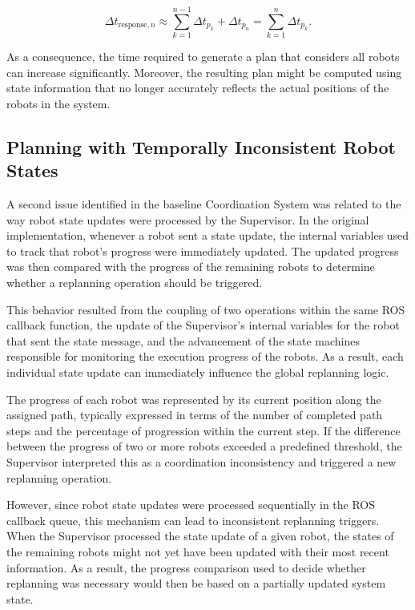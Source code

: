\begin{equation}
    \Delta t_{\text{response},n}
    \approx
    \sum_{k=1}^{n-1} \Delta t_{p_k} + \Delta t_{p_n}
    =
    \sum_{k=1}^{n} \Delta t_{p_k}.
    \label{eq:baseline_response_time}
\end{equation}

As a consequence, the time required to generate a plan that considers all robots can increase significantly. Moreover, the resulting plan might be computed using state information that no longer accurately reflects the actual positions of the robots in the system.

\subsection{Planning with Temporally Inconsistent Robot States}
\label{subsec:temporally_inconsistent_states}
\hspace{\parindent}
A second issue identified in the baseline Coordination System was related to the way robot state updates were processed by the Supervisor. In the original implementation, whenever a robot sent a state update, the internal variables used to track that robot's progress were immediately updated. The updated progress was then compared with the progress of the remaining robots to determine whether a replanning operation should be triggered.

This behavior resulted from the coupling of two operations within the same ROS callback function, the update of the Supervisor's internal variables for the robot that sent the state message, and the advancement of the state machines responsible for monitoring the execution progress of the robots. As a result, each individual state update can immediately influence the global replanning logic.

The progress of each robot was represented by its current position along the assigned path, typically expressed in terms of the number of completed path steps and the percentage of progression within the current step. If the difference between the progress of two or more robots exceeded a predefined threshold, the Supervisor interpreted this as a coordination inconsistency and triggered a new replanning operation.

However, since robot state updates were processed sequentially in the ROS callback queue, this mechanism can lead to inconsistent replanning triggers. When the Supervisor processed the state update of a given robot, the states of the remaining robots might not yet have been updated with their most recent information. As a result, the progress comparison used to decide whether replanning was necessary would then be based on a partially updated system state.

